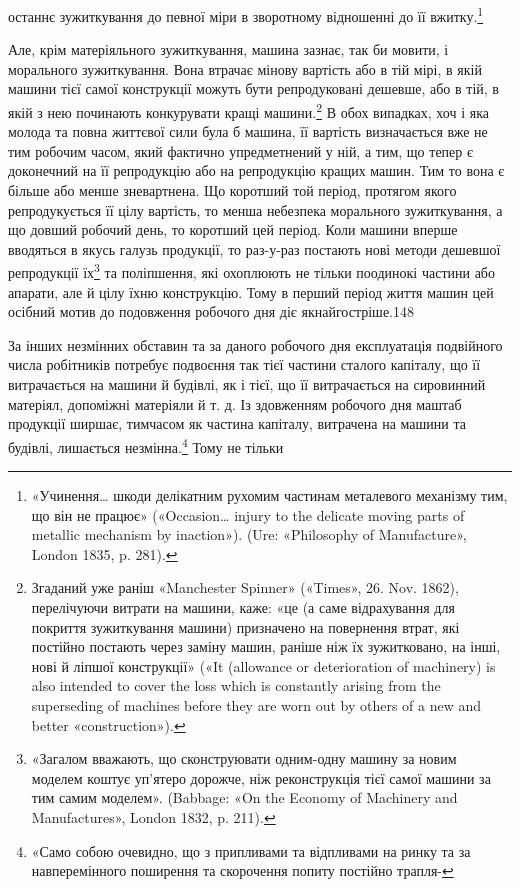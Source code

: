 \parcont{}  %
останнє зужиткування до певної міри в зворотному відношенні
до її вжитку.\footnote{
«Учинення\dots{} шкоди делікатним рухомим частинам металевого
механізму тим, що він не працює» («Occasion\dots{} injury to the delicate
moving parts of metallic mechanism by inaction»). (Ure: «Philosophy
of Manufacture», London 1835, p. 281).
}

Але, крім матеріяльного зужиткування, машина зазнає, так би
мовити, і морального зужиткування. Вона втрачає мінову вартість
або в тій мірі, в якій машини тієї самої конструкції можуть бути
репродуковані дешевше, або в тій, в якій з нею починають конкурувати
кращі машини.\footnote{
Згаданий уже раніш «Manchester Spinner» («Times», 26. Nov. 1862),
перелічуючи витрати на машини, каже: «це (а саме відрахування для покриття
зужиткування машини) призначено на повернення втрат, які постійно
постають через заміну машин, раніше ніж їх зужитковано, на інші,
нові й ліпшої конструкції» («It (allowance or deterioration of machinery)
is also intended to cover the loss which is constantly arising from the superseding
of machines before they are worn out by others of a new and better
«construction»).
} В обох випадках, хоч і яка молода
та повна життєвої сили була б машина, її вартість визначається вже
не тим робочим часом, який фактично упредметнений у ній, а тим,
що тепер є доконечний на її репродукцію або на репродукцію
кращих машин. Тим то вона є більше або менше зневартнена.
Що коротший той період, протягом якого репродукується її цілу
вартість, то менша небезпека морального зужиткування, а що
довший робочий день, то коротший цей період. Коли машини вперше
вводяться в якусь галузь продукції, то раз-у-раз постають
нові методи дешевшої репродукції їх\footnote{
«Загалом вважають, що сконструювати одним-одну машину за
новим моделем коштує уп’ятеро дорожче, ніж реконструкція тієї самої
машини за тим самим моделем». (Babbage: «On the Economy of Machinery
and Manufactures», London 1832, p. 211).
} та поліпшення, які охоплюють
не тільки поодинокі частини або апарати, але й цілу їхню
конструкцію. Тому в перший період життя машин цей осібний
мотив до подовження робочого дня діє якнайгостріше.148

За інших незмінних обставин та за даного робочого дня експлуатація
подвійного числа робітників потребує подвоєння так
тієї частини сталого капіталу, що її витрачається на машини й
будівлі, як і тієї, що її витрачається на сировинний матеріял,
допоміжні матеріяли й т. д. Із здовженням робочого дня маштаб
продукції ширшає, тимчасом як частина капіталу, витрачена
на машини та будівлі, лишається незмінна.\footnote{
«Само собою очевидно, що з припливами та відпливами на ринку
та за навперемінного поширення та скорочення попиту постійно трапля-
} Тому не тільки

